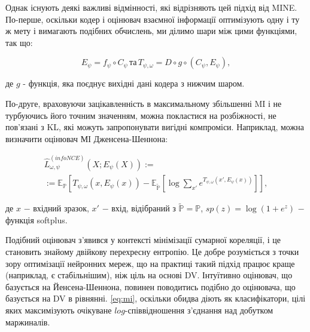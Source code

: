Однак існують деякі важливі відмінності, які відрізняють цей підхід від MINE. По-перше, оскільки кодер і оцінювач взаємної інформації оптимізують одну і ту ж мету і вимагають подібних обчислень, ми ділимо шари між цими функціями, так що: 

\begin{equation}\label{eq:hz}
	E_{\psi} = f_{\psi} \circ C_{\psi} \, \text{та} \, T_{\psi, \omega} = D \circ g \circ (C_{\psi}, E_{\psi}), 
\end{equation}

\noindent де $g$ - функція, яка поєднує вихідні дані кодера з нижчим шаром.

\vspace{1.5em}

По-друге, враховуючи зацікавленність в максимальному збільшенні MI і не турбуючись його точним значенням, можна покластися на розбіжності, не пов’язані з KL, які можуть запропонувати вигідні компроміси. Наприклад, можна визначити оцінювач МІ Дженсена-Шеннона:

\begin{eqnarray}\label{eq:mi}
\hat{L}_{\omega, \psi}^{(infoNCE)}(X;E_{\psi}(X)) := \\ := \mathbb{E_{P}}\left[T_{\psi,\omega}(x, E_{\psi}(x)) - \mathbb{E_{\tilde{P}}}\left[\log{\sum_{x'}{e^{T_{\psi, \omega}(x',E_{\psi}(x))}}}\right]\right],
\end{eqnarray}

\noindent де $x$ $-$ вхідний зразок, \newline
\hspace*{15pt} $x'$ $-$ вхід, відібраний з $\tilde{\mathbb{P}} = \mathbb{P}$, \newline
\hspace*{15pt} $sp(z) = \log{(1 + e^{z})}$ $-$ функція softplus. 

\vspace{1.5em}

Подібний оцінювач з'явився у контексті мінімізації сумарної кореляції, і це становить знайому двійкову перехресну ентропію. Це добре розуміється з точки зору оптимізації нейронних мереж, що на практиці такий підхід працює краще (наприклад, є стабільнішим), ніж ціль на основі DV. Інтуїтивно оцінювач, що базується на Йенсена-Шеннона, повинен поводитись подібно до оцінювача, що базується на DV в рівнянні. \ref{eq:mi}, оскільки обидва діють як класифікатори, цілі яких максимізують очікуване $log$-співвідношення з'єднання над добутком маржиналів.

